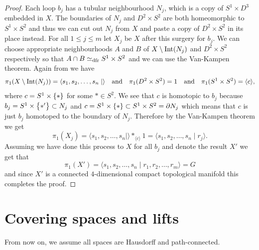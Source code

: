 \documentclass[11pt,a4paper]{article}
\begin{document}
\begin{proof}
  Each loop $b_j$ has a tubular neighbourhood $N_j$, which
  is a copy of $S^1 \times D^3$ embedded in $X$.
  The boundaries of $N_j$ and $D^2 \times S^2$ are both homeomorphic to
  $S^1 \times S^2$ and thus we can cut out $N_j$ from $X$
  and paste a copy of $D^2 \times S^2$ in its place instead.
  For all $1 \le j \le m$ let $X_j$ be $X$ after this surgery for $b_j$.
  We can choose appropriate neighbourhoods $A$ and $B$ of
  $X \setminus \operatorname{Int}(N_j)$ and $D^2 \times S^2$ respectively so
  that $A \cap B \simeq_{\operatorname{dfr}} S^1 \times S^2$ and we can use
  the Van-Kampen theorem.
  Again from  we have
  \[
    \pi_1(X \setminus \operatorname{Int}(N_j)) = \langle s_1,s_2,\dots,s_n \mid \rangle
    \quad \text{and} \quad
    \pi_1(D^2 \times S^2) = 1
    \quad \text{and} \quad
    \pi_1(S^1 \times S^2) = \langle c \rangle,
  \]
  where $c = S^1 \times \left\{*\right\}$ for some $* \in S^2$.
  We see that $c$ is homotopic to $b_j$
  because $b_j = S^1 \times \left\{*'\right\} \subset N_j$
  and $c = S^1 \times \left\{*\right\} \subset S^1 \times S^2 = \partial N_j$
  which means that $c$ is just $b_j$ homotoped to the boundary
  of $N_j$.
  Therefore by the Van-Kampen theorem we get
  \[
    \pi_1(X_j) =
    \langle s_1,s_2,\dots,s_n \mid \rangle *_{\langle c \rangle} 1 =
    \langle s_1,s_2,\dots,s_n \mid r_j \rangle.
  \]
  Assuming we have done this process to $X$ for all $b_j$ 
  and denote the result $X'$ we get that
  \[
    \pi_1(X') =
    \langle s_1,s_2,\dots,s_n \mid r_1,r_2,\dots,r_m \rangle =
    G
  \]
  and since $X'$ is a connected $4$-dimensional
  compact topological manifold this completes the proof.
\end{proof}

\newpage

\section{Covering spaces and lifts}
\begin{remark}
  From now on, we assume all spaces are Hausdorff and path-connected.
\end{remark}
\end{document}
